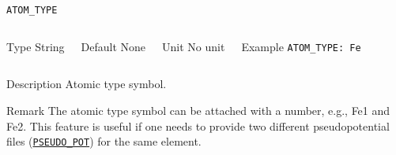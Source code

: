 \documentclass[xcolor=dvipsnames,t]{beamer}
\begin{document}
\begin{frame}[allowframebreaks]{\texttt{ATOM\_TYPE}} \label{ATOM_TYPE}
\vspace*{-12pt}
\begin{columns}
\begin{block}{Type}
String
\end{block}

\begin{block}{Default}
None
\end{block}

\begin{block}{Unit}
No unit
\end{block}

\begin{block}{Example}
\texttt{ATOM\_TYPE: Fe}  
\end{block}
\end{columns}

\begin{block}{Description}
Atomic type symbol. 
\end{block}

\begin{block}{Remark}
The atomic type symbol can be attached with a number, e.g., Fe1 and Fe2. This feature is useful if one needs to provide two different pseudopotential files (\hyperlink{PSEUDO_POT}{\texttt{PSEUDO\_POT}}) for the same element.
\end{block}

\end{frame}
\end{document}
